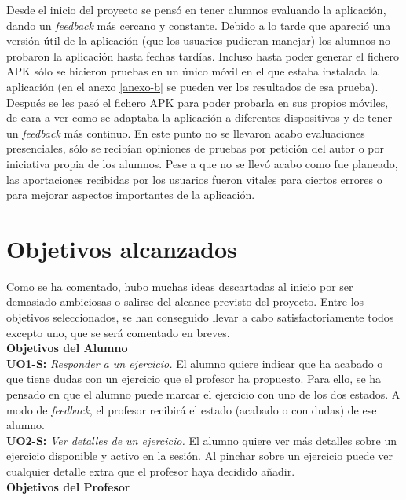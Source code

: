 Desde el inicio del proyecto se pensó en tener alumnos evaluando la aplicación, dando un \textit{feedback} más cercano y constante. Debido a lo tarde que apareció una versión útil de la aplicación (que los usuarios pudieran manejar) los alumnos no probaron la aplicación hasta fechas tardías. Incluso hasta poder generar el fichero APK sólo se hicieron pruebas en un único móvil en el que estaba instalada la aplicación (en el anexo \ref{anexo-b} se pueden ver los resultados de esa prueba). Después se les pasó el fichero APK para poder probarla en sus propios móviles, de cara a ver como se adaptaba la aplicación a diferentes dispositivos y de tener un \textit{feedback} más continuo. En este punto no se llevaron acabo evaluaciones presenciales, sólo se recibían opiniones de pruebas por petición del autor o por iniciativa propia de los alumnos. Pese a que no se llevó acabo como fue planeado, las aportaciones recibidas por los usuarios fueron vitales para ciertos errores o para mejorar aspectos importantes de la aplicación.\\

\section{Objetivos alcanzados}

Como se ha comentado, hubo muchas ideas descartadas al inicio por ser demasiado ambiciosas o salirse del alcance previsto del proyecto. Entre los objetivos seleccionados, se han conseguido llevar a cabo satisfactoriamente todos excepto uno, que se será comentado en breves.\\

\textbf{Objetivos del Alumno}\\

\textbf{UO1-S:} \textit{Responder a un ejercicio.} El alumno quiere indicar que ha acabado o que tiene dudas con un ejercicio que el profesor ha propuesto. Para ello, se ha pensado en que el alumno puede marcar el ejercicio con uno de los dos estados. A modo de \textit{feedback}, el profesor recibirá el estado (acabado o con dudas) de ese alumno.\\

\textbf{UO2-S:} \textit{Ver detalles de un ejercicio.} El alumno quiere ver más detalles sobre un ejercicio disponible y activo en la sesión. Al pinchar sobre un ejercicio puede ver cualquier detalle extra que el profesor haya decidido añadir.\\

\textbf{Objetivos del Profesor}\\

